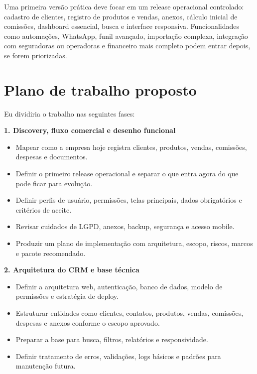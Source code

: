 \documentclass[11pt,a4paper]{article}
\begin{document}
Uma primeira versão prática deve focar em um release operacional controlado: cadastro de clientes, registro de produtos e vendas, anexos, cálculo inicial de comissões, dashboard essencial, busca e interface responsiva. Funcionalidades como automações, WhatsApp, funil avançado, importação complexa, integração com seguradoras ou operadoras e financeiro mais completo podem entrar depois, se forem priorizadas.\par

\section*{Plano de trabalho proposto}

Eu dividiria o trabalho nas seguintes fases:\par

\textbf{1. Discovery, fluxo comercial e desenho funcional}\par

\begin{itemize}
\item Mapear como a empresa hoje registra clientes, produtos, vendas, comissões, despesas e documentos.
\item Definir o primeiro release operacional e separar o que entra agora do que pode ficar para evolução.
\item Definir perfis de usuário, permissões, telas principais, dados obrigatórios e critérios de aceite.
\item Revisar cuidados de LGPD, anexos, backup, segurança e acesso mobile.
\item Produzir um plano de implementação com arquitetura, escopo, riscos, marcos e pacote recomendado.
\end{itemize}

\textbf{2. Arquitetura do CRM e base técnica}\par

\begin{itemize}
\item Definir a arquitetura web, autenticação, banco de dados, modelo de permissões e estratégia de deploy.
\item Estruturar entidades como clientes, contatos, produtos, vendas, comissões, despesas e anexos conforme o escopo aprovado.
\item Preparar a base para busca, filtros, relatórios e responsividade.
\item Definir tratamento de erros, validações, logs básicos e padrões para manutenção futura.
\end{itemize}
\end{document}
